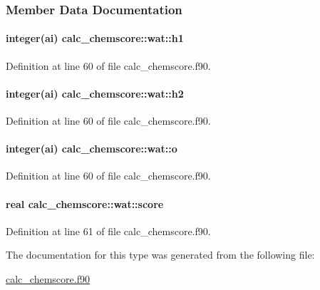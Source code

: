 \subsubsection{Member Data Documentation}
\hypertarget{structcalc__chemscore_1_1wat_ac24fafde9abc7332ae838bef57aad269}{
\paragraph[{h1}]{\setlength{\rightskip}{0pt plus 5cm}integer(ai) calc\-\_\-chemscore\-::wat\-::h1}}\label{structcalc__chemscore_1_1wat_ac24fafde9abc7332ae838bef57aad269}


Definition at line 60 of file calc\-\_\-chemscore.\-f90.

\hypertarget{structcalc__chemscore_1_1wat_a842d5fdfaf7bb72f07e53b07b4185cf3}{
\paragraph[{h2}]{\setlength{\rightskip}{0pt plus 5cm}integer(ai) calc\-\_\-chemscore\-::wat\-::h2}}\label{structcalc__chemscore_1_1wat_a842d5fdfaf7bb72f07e53b07b4185cf3}


Definition at line 60 of file calc\-\_\-chemscore.\-f90.

\hypertarget{structcalc__chemscore_1_1wat_ae92261d880319f2bc8ba2cc84172623d}{
\paragraph[{o}]{\setlength{\rightskip}{0pt plus 5cm}integer(ai) calc\-\_\-chemscore\-::wat\-::o}}\label{structcalc__chemscore_1_1wat_ae92261d880319f2bc8ba2cc84172623d}


Definition at line 60 of file calc\-\_\-chemscore.\-f90.

\hypertarget{structcalc__chemscore_1_1wat_a2e3ecfc1a3bb401e862c54ff6b7fd75e}{
\paragraph[{score}]{\setlength{\rightskip}{0pt plus 5cm}real calc\-\_\-chemscore\-::wat\-::score}}\label{structcalc__chemscore_1_1wat_a2e3ecfc1a3bb401e862c54ff6b7fd75e}


Definition at line 61 of file calc\-\_\-chemscore.\-f90.



The documentation for this type was generated from the following file\-:\begin{DoxyCompactItemize}
\item 
\hyperlink{calc__chemscore_8f90}{calc\-\_\-chemscore.\-f90}\end{DoxyCompactItemize}
